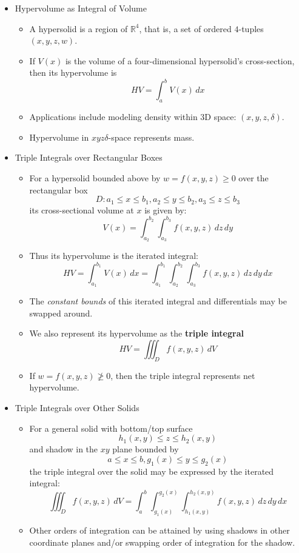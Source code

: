 \documentclass[12pt]{article}
\newcommand{\dvar}[1]{\,d{#1}}
\renewcommand{\d}[1]{\dvar{#1}}
\newcommand{\<}{\left<}
\renewcommand{\>}{\right>}
\begin{document}
  \begin{itemize}

  \item Hypervolume as Integral of Volume

    \begin{itemize}
    \item A hypersolid is a region of $\mathbb{R}^4$, that is, a set of ordered $4$-tuples $(x,y,z,w)$.
    \item If $V(x)$ is the volume of a four-dimensional hypersolid's cross-section, then its hypervolume is
      \[
        HV  = \int_a^b V(x)\d{x}
      \]
    \item Applications include modeling density within 3D space: $(x,y,z,\delta)$.
    \item Hypervolume in $xyz\delta$-space represents mass.
    \end{itemize}
  
  \item Triple Integrals over Rectangular Boxes
  
    \begin{itemize}
    \item For a hypersolid bounded above by $w=f(x,y,z)\geq 0$ over the rectangular box \[D: a_1\leq x\leq b_1, a_2\leq y\leq b_2, a_3\leq z\leq b_3 \] its cross-sectional volume at $x$ is given by:
      \[
        V(x) = \int_{a_2}^{b_2}\int_{a_3}^{b_3} f(x,y,z)\d{z}\d{y}
      \]
    \item Thus its hypervolume is the iterated integral:
      \[
        HV = \int_{a_1}^{b_1} V(x)\d{x} = \int_{a_1}^{b_1}\int_{a_2}^{b_2}\int_{a_3}^{b_3} f(x,y,z)\d{z}\d{y}\d{x}
      \]
    \item The \textit{constant bounds} of this iterated integral and differentials may be swapped around.
    \item We also represent its hypervolume as the \textbf{triple integral}
      \[
        HV = \iiint_D f(x,y,z)\d{V}
      \]
    \item If $w=f(x,y,z)\not\geq 0$, then the triple integral represents net hypervolume.
    \end{itemize}
  \newpage
  
  \item Triple Integrals over Other Solids
  
    \begin{itemize}
    \item For a general solid with bottom/top surface 
      \[
        h_1(x,y)\leq z \leq h_2(x,y)
      \] 
      and shadow in the $xy$ plane bounded by 
      \[
        a\leq x\leq b, g_1(x)\leq y\leq g_2(x)
      \]
      the triple integral over the solid may be expressed by the iterated integral:
      \[
        \iiint_D f(x,y,z)\d{V} = \int_{a}^{b}\int_{g_1(x)}^{g_2(x)}\int_{h_1(x,y)}^{h_2(x,y)} f(x,y,z)\d{z}\d{y}\d{x}
      \]
    \item Other orders of integration can be attained by using shadows in other coordinate planes and/or swapping order of integration for the shadow.
    \end{itemize}
  

\end{itemize}
\end{document}
